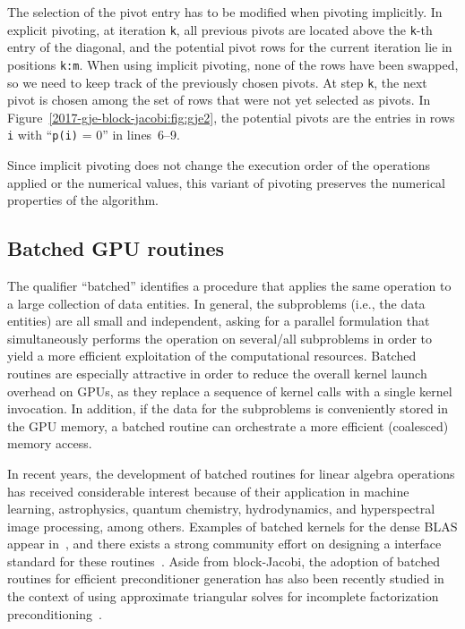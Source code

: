 The selection of the pivot entry has to be modified when pivoting implicitly.
In explicit pivoting, at iteration \texttt{k}, all previous pivots are located above the \texttt{k}-th entry of the diagonal,
and the potential pivot rows for the current iteration lie in positions \texttt{k:m}.
When using implicit pivoting, {none of the rows} have been swapped, so we need to keep 
track of the previously chosen pivots.
At step \texttt{k}, the next pivot is chosen among the set of rows
that were not yet selected as pivots.
In Figure~\ref{2017-gje-block-jacobi:fig:gje2}, the potential pivots are the entries in rows {\tt i} with ``\texttt{p(i)} = 0''  in lines~6--9.


Since implicit pivoting does not change the execution order of the 
operations applied or the numerical values,
this variant of pivoting preserves the numerical properties of the algorithm.

\subsection{Batched GPU routines} \label{2017-gje-block-jacobi:sec:batched}

The qualifier ``batched'' identifies a procedure that applies the same operation to a large collection of data entities.
In general, the subproblems (i.e., the data entities) are all small and independent, 
asking for a parallel formulation that
simultaneously performs the operation on several/all subproblems in order to
yield a more efficient exploitation of the computational resources.
Batched routines are especially attractive 
{in order to reduce} 
the overall kernel launch overhead on GPUs, as they replace a sequence of kernel calls with a single kernel invocation.
In addition, if the data for the subproblems is conveniently stored in the GPU memory,
a batched routine can orchestrate a more efficient (coalesced) memory access.

In recent years, 
the development of batched routines for linear algebra
operations has received considerable interest
because of their {application in}
machine learning, astrophysics, quantum
chemistry, hydrodynamics, and hyperspectral image processing, among others.
Examples of batched 
kernels for the dense BLAS appear in~\cite{7275187,Haidar:2015:BMC:2766466.2766470},
and there exists a strong community effort on designing a interface standard for these routines~\cite{bblas}.
Aside from block-Jacobi, the {adoption} of batched routines for efficient
preconditioner generation has also
been recently studied in the context of using approximate triangular solves for
incomplete factorization preconditioning~\cite{scala2016,Anzt:2017:BGE:3026937.3026940}.

